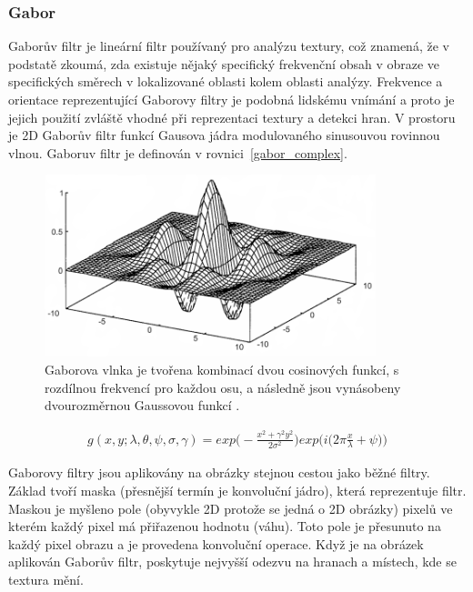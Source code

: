 \documentclass[czech,BP]{thesiskiv}
\begin{document}
\subsubsection{Gabor}
\par Gaborův filtr je lineární filtr používaný pro analýzu textury, což znamená, že v podstatě zkoumá, zda existuje nějaký specifický frekvenční obsah v obraze ve specifických směrech v lokalizované oblasti kolem oblasti analýzy. Frekvence a orientace reprezentující Gaborovy filtry je podobná lidskému vnímání a proto je jejich použití zvláště vhodné při reprezentaci textury a detekci hran. V prostoru je 2D Gaborův filtr funkcí Gausova jádra modulovaného sinusouvou rovinnou vlnou. Gaboruv filtr je definován v rovnici~\ref{gabor_complex}.

\begin{figure}[H]
		\centering
		\includegraphics[height=200px]{./img/gabor.png}
		\caption{Gaborova vlnka je tvořena kombinací dvou cosinových funkcí, s rozdílnou frekvencí pro každou osu, a následně jsou vynásobeny dvourozměrnou Gaussovou funkcí \cite{Gabor}.} 					
\end{figure}

\begin{align}
   \label{gabor_complex}  g(x, y; \lambda, \theta, \psi, \sigma,  \gamma) = exp \Bigg( - \frac{{x^2 + \gamma^2 y^2}}{2 \sigma^2} \Bigg) exp \Bigg(i \bigg(2\pi \frac{x}{\lambda} + \psi \bigg)\Bigg)  
\end{align}

\par Gaborovy filtry jsou aplikovány na obrázky stejnou cestou jako běžné filtry. Základ tvoří maska (přesnější termín je konvoluční jádro), která reprezentuje filtr. Maskou je myšleno pole (obyvykle 2D protože se jedná o 2D obrázky) pixelů ve kterém každý pixel má přiřazenou hodnotu (váhu). Toto pole je přesunuto na každý pixel obrazu a je provedena konvoluční operace. Když je na obrázek aplikován Gaborův filtr, poskytuje nejvyšší odezvu na hranach a místech, kde se textura mění. \cite{Gabor_wordpress}
\end{document}
